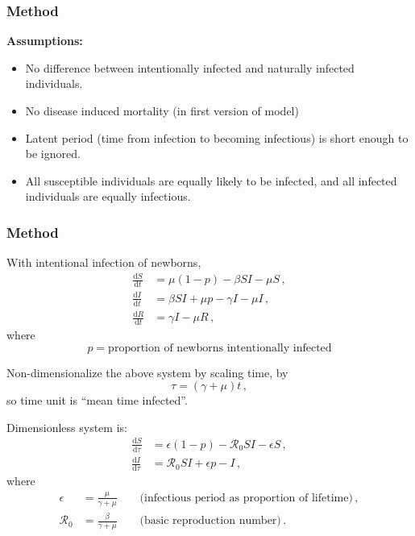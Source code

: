 \documentclass[12pt]{beamer}
\newcommand\dbyd[2]{\frac{\mathrm d{#1}}{\mathrm d{#2}}}
\newcommand{\R}{\mathcal{R}}
\begin{document}
\begin{frame}
\frametitle{Method}
{\bfseries Assumptions:}
\begin{itemize}\itemsep10pt
\item No difference between intentionally infected and naturally infected individuals.
\item No disease induced mortality \qquad (in first version of model)
\item Latent period (time from infection to becoming infectious) is short enough to be ignored.
\item All susceptible individuals are equally likely to be infected, and all infected individuals are equally infectious.
\end{itemize}
\end{frame}
\begin{frame}
\frametitle{Method}
With intentional infection of newborns, 
\begin{equation}\label{2}
\begin{split}
\dbyd{S}{t}&=\mu(1-p)- \beta SI-\mu S \,,\\
\dbyd{I}{t}&=\beta SI+\mu p-\gamma I -\mu I\,,\\
\dbyd{R}{t}&=\gamma I-\mu R\,,
\end{split}
\end{equation}
where 
$$
p  = \text{proportion of newborns intentionally infected}
$$
\end{frame}
\begin{frame}
Non-dimensionalize the above system by scaling time, by
\begin{equation}
\tau=(\gamma+\mu)t \,,
\end{equation}
so time unit is ``mean time infected''.

\pause
Dimensionless system is:
\begin{subequations}\label{3}
\begin{align}
\dbyd{S}{\tau}&=\epsilon(1-p)- \R_0  SI-\epsilon S \,,\\
\dbyd{I}{\tau}&=\R_0 SI+\epsilon p-I \,,
\end{align}
\end{subequations}
where 
%
\begin{subequations}
\begin{align}
\epsilon&=\frac{\mu}{\gamma+\mu} \qquad\text{(infectious period as
          proportion of lifetime)}\,,\\
\R_0&=\frac{\beta}{\gamma+\mu} \qquad\text{(basic reproduction number)}\,.
\end{align}
\end{subequations}
%


\end{frame}
\end{document}
